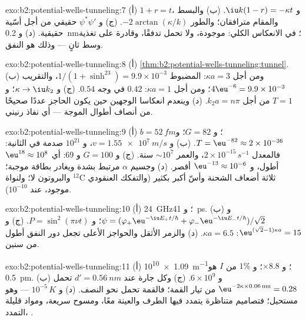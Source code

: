 \begin{solution}{exo:b2:potential-wells-tunneling:7}
(أ) $1 + r = t$، و $\iu k(1 - r) = -\kappa t$. (ب) والبسط والمقام
مترافقان؛ والطور $-2\arctan(\kappa/k)$. (ج) و $\psi^*\psi'$ حقيقي من أجل
أسّية حقيقية. (د) و \qty{0.2}{nm}؛  في الانعكاس
الكلي: موجودة، ولا تحمل تدفقًا، وقادرة على تغذية وسط ثانٍ
--- وذلك هو النفق.
\end{solution}

\begin{solution}{exo:b2:potential-wells-tunneling:8}
(أ) \cref{thm:b2:potential-wells-tunneling:tunnel}. (ب) ومن أجل $\kappa a = 3$:
المضبوط $1/(1 + \sinh^23) = 9.9 \times 10^{-3}$، والتقريب $4\eu^{-6} = 9.9 \times
10^{-3}$؛ ومن أجل $\kappa a = 1$: $0.42$ في وجه $0.54$. (ج) و $\kappa \to \iu k_2$؛ و $T = 1$
من أجل $k_2a = n\pi$. (د) وينعدم انعكاسا الوجهين حين يكون
الحاجز عددًا صحيحًا من أنصاف أطوال الموجة --- أي نفاذ
رنيني.
\end{solution}

\begin{solution}{exo:b2:potential-wells-tunneling:9}
(أ) $b = \qty{52}{fm}$؛ و $G = 82$؛ و $T = \eu^{-82} \approx 2 \times 10^{-36}$. (ب) و $v =
\qty{1.55e7}{m/s}$، و $10^{21}$ صدمة في الثانية: فالمعدل $2 \times 10^{-15}\,\unit{s^{-1}}$،
والعمر $\sim 10^7$ سنة. (ج) و $G = 100$ و $69$: أي $\eu^{18} \approx 10^8$ أطول،
و $\eu^{-13} \approx 10^{-6}$ أقصر. (د) وجسيم $\alpha$ مرتبط بشدة ويغادر
بطاقة موجبة؛ والبروتون لا؛ ولنواة $^{12}$C ثلاثة أضعاف
الشحنة وأسّ أكبر بكثير (والتفكك العنقودي موجود، عند $10^{-10}$).
\end{solution}

\begin{solution}{exo:b2:potential-wells-tunneling:10}
(أ) \qty{24}{GHz}؛ و \qty{41}{ps}. (ب) و $\psi = (\varphi_+\eu^{-\iu E_+t/\hbar} +
\varphi_-\eu^{-\iu E_-t/\hbar})/\sqrt2$؛ و $P = \sin^2(\pi\nu t)$. (ج) و $\eu^{(\sqrt2 - 1)
\kappa a} = 15$: $\kappa a = 6.5$. (د) والزمر الأثقل والحواجز الأعلى تجعل
دور النفق أطول من سنين.
\end{solution}

\begin{solution}{exo:b2:potential-wells-tunneling:11}
(أ) \qty{1.09e10}{m^{-1}}؛ و $\times 8.8$؛ و $1\%$ من $I$ هو \qty{0.5}{pm}. (ب) و $6 \times 10^9$.
(ج) وكل جارة عند $d' = \qty{0.56}{nm}$ تحمل $\eu^{-2\kappa \times 0.06\,\text{nm}}
= 0.28$ من تيار القمة؛ فالقمة تحمل نحو النصف. (د)
و $10^{-5}\,\unit{K}$ --- وهو مستحيل؛ فتصاميم متناظرة يتمدد فيها الطرف والعينة
معًا، ومسوح سريعة، ومواد قليلة التمدد، .
\end{solution}

